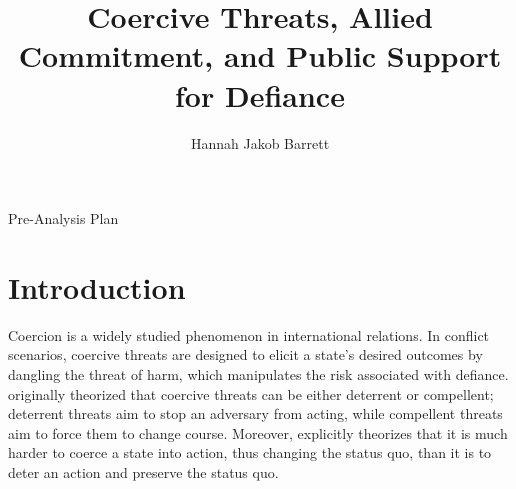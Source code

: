 

\title{Coercive Threats, Allied Commitment, and Public Support for Defiance}

\author{Hannah Jakob Barrett}


\maketitle
\begin{center}
    Pre-Analysis Plan
\end{center}

\section{Introduction}
Coercion is a widely studied phenomenon in international relations. In conflict scenarios, coercive threats are designed to elicit a state's desired outcomes by dangling the threat of harm, which manipulates the risk associated with defiance. \textcite{schelling_arms_1966} originally theorized that coercive threats can be either deterrent or compellent; deterrent threats aim to stop an adversary from acting, while compellent threats aim to force them to change course. Moreover, \textcite{schelling_arms_1966} explicitly theorizes that it is much harder to coerce a state into action, thus changing the status quo, than it is to deter an action and preserve the status quo. 

